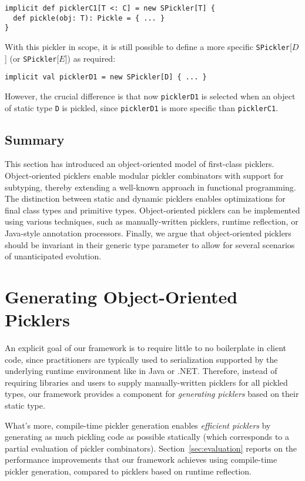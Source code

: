 \documentclass[preprint,10pt]{sigplanconf}
\theoremstyle{definition}
\newcommand{\term}[1]{\mbox{\texttt{#1}}}
\begin{document}
\begin{lstlisting}
implicit def picklerC1[T <: C] = new SPickler[T] {
  def pickle(obj: T): Pickle = { ... }
}
\end{lstlisting}

With this pickler in scope, it is still possible to define a more specific
\term{SPickler}[$D$] (or \term{SPickler}[$E$]) as required:

\begin{lstlisting}
implicit val picklerD1 = new SPickler[D] { ... }
\end{lstlisting}

However, the crucial difference is that now \term{picklerD1} is selected when
an object of static type \term{D} is pickled, since \term{picklerD1} is more
specific than \term{picklerC1}.

\subsection{Summary}

This section has introduced an object-oriented model of first-class picklers.
Object-oriented picklers enable modular pickler combinators with support for
subtyping, thereby extending a well-known approach in functional programming.
The distinction between static and dynamic picklers enables optimizations for
final class types and primitive types. Object-oriented picklers can be
implemented using various techniques, such as manually-written picklers,
runtime reflection, or Java-style annotation processors. Finally, we argue
that object-oriented picklers should be invariant in their generic type
parameter to allow for several scenarios of unanticipated evolution.


\section{Generating Object-Oriented Picklers}

An explicit goal of our framework is to require little to no boilerplate in
client code, since practitioners are typically used to serialization supported
by the underlying runtime environment like in Java or .NET. Therefore, instead
of requiring libraries and users to supply manually-written picklers for all
pickled types, our framework provides a component for
{\em generating picklers} based on their static type.

What's more, compile-time pickler generation enables {\em efficient picklers}
by generating as much pickling code as possible statically (which corresponds
to a partial evaluation of pickler combinators). Section~\ref{sec:evaluation}
reports on the performance improvements that our framework achieves using
compile-time pickler generation, compared to picklers based on runtime
reflection.
\end{document}

